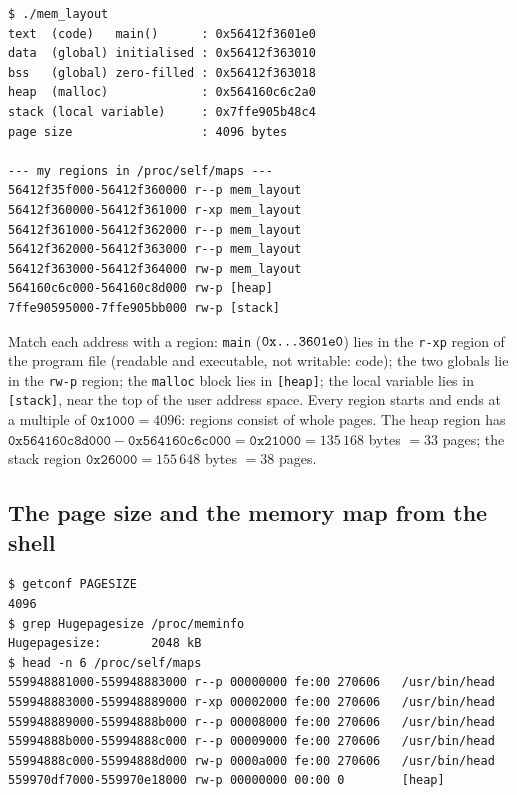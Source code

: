 \documentclass[11pt,a4paper]{article}
\newcommand{\cmd}[1]{\texttt{#1}}
\begin{document}

\vspace{-0.6em}


\begin{lstlisting}[style=term]
$ ./mem_layout
text  (code)   main()      : 0x56412f3601e0
data  (global) initialised : 0x56412f363010
bss   (global) zero-filled : 0x56412f363018
heap  (malloc)             : 0x564160c6c2a0
stack (local variable)     : 0x7ffe905b48c4
page size                  : 4096 bytes

--- my regions in /proc/self/maps ---
56412f35f000-56412f360000 r--p mem_layout
56412f360000-56412f361000 r-xp mem_layout
56412f361000-56412f362000 r--p mem_layout
56412f362000-56412f363000 r--p mem_layout
56412f363000-56412f364000 rw-p mem_layout
564160c6c000-564160c8d000 rw-p [heap]
7ffe90595000-7ffe905bb000 rw-p [stack]
\end{lstlisting}

Match each address with a region: \cmd{main} ($\texttt{0x\dots3601e0}$) lies in the \texttt{r-xp} region of the program file (readable and executable, not writable: code); the two globals lie in the \texttt{rw-p} region; the \cmd{malloc} block lies in \texttt{[heap]}; the local variable lies in \texttt{[stack]}, near the top of the user address space. Every region starts and ends at a multiple of $\texttt{0x1000} = 4096$: regions consist of whole pages. The heap region has $\texttt{0x564160c8d000} - \texttt{0x564160c6c000} = \texttt{0x21000} = 135\,168$ bytes $= 33$ pages; the stack region $\texttt{0x26000} = 155\,648$ bytes $= 38$ pages.

\subsection{The page size and the memory map from the shell}

\begin{lstlisting}[style=term]
$ getconf PAGESIZE
4096
$ grep Hugepagesize /proc/meminfo
Hugepagesize:       2048 kB
$ head -n 6 /proc/self/maps
559948881000-559948883000 r--p 00000000 fe:00 270606   /usr/bin/head
559948883000-559948889000 r-xp 00002000 fe:00 270606   /usr/bin/head
559948889000-55994888b000 r--p 00008000 fe:00 270606   /usr/bin/head
55994888b000-55994888c000 r--p 00009000 fe:00 270606   /usr/bin/head
55994888c000-55994888d000 rw-p 0000a000 fe:00 270606   /usr/bin/head
559970df7000-559970e18000 rw-p 00000000 00:00 0        [heap]
\end{lstlisting}
\end{document}
